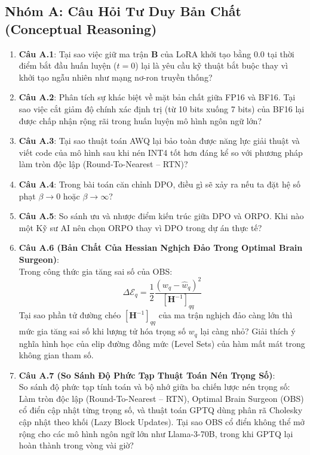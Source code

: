 \subsection{Nhóm A: Câu Hỏi Tư Duy Bản Chất (Conceptual Reasoning)}
\begin{enumerate}
  \item \textbf{Câu A.1}: Tại sao việc giữ ma trận $\mathbf{B}$ của LoRA khởi tạo bằng $0.0$ tại thời điểm bắt đầu huấn luyện ($t=0$) lại là yêu cầu kỹ thuật bắt buộc thay vì khởi tạo ngẫu nhiên như mạng nơ-ron truyền thống?
  \item \textbf{Câu A.2}: Phân tích sự khác biệt về mặt bản chất giữa FP16 và BF16. Tại sao việc cắt giảm độ chính xác định trị (từ 10 bits xuống 7 bits) của BF16 lại được chấp nhận rộng rãi trong huấn luyện mô hình ngôn ngữ lớn?
  \item \textbf{Câu A.3}: Tại sao thuật toán AWQ lại bảo toàn được năng lực giải thuật và viết code của mô hình sau khi nén INT4 tốt hơn đáng kể so với phương pháp làm tròn độc lập (Round-To-Nearest -- RTN)?
  \item \textbf{Câu A.4}: Trong bài toán căn chỉnh DPO, điều gì sẽ xảy ra nếu ta đặt hệ số phạt $\beta \to 0$ hoặc $\beta \to \infty$?
  \item \textbf{Câu A.5}: So sánh ưu và nhược điểm kiến trúc giữa DPO và ORPO. Khi nào một Kỹ sư AI nên chọn ORPO thay vì DPO trong dự án thực tế?
  \item \textbf{Câu A.6 (Bản Chất Của Hessian Nghịch Đảo Trong Optimal Brain Surgeon)}: \\
  Trong công thức gia tăng sai số của OBS:
  \begin{equation*}
  \Delta \mathcal{E}_q = \frac{1}{2} \frac{(w_q - \hat{w}_q)^2}{[\mathbf{H}^{-1}]_{qq}}
  \end{equation*}
  Tại sao phần tử đường chéo $[\mathbf{H}^{-1}]_{qq}$ của ma trận nghịch đảo càng lớn thì mức gia tăng sai số khi lượng tử hóa trọng số $w_q$ lại càng nhỏ? Giải thích ý nghĩa hình học của elip đường đồng mức (Level Sets) của hàm mất mát trong không gian tham số.
  \item \textbf{Câu A.7 (So Sánh Độ Phức Tạp Thuật Toán Nén Trọng Số)}: \\
  So sánh độ phức tạp tính toán và bộ nhớ giữa ba chiến lược nén trọng số: Làm tròn độc lập (Round-To-Nearest -- RTN), Optimal Brain Surgeon (OBS) cổ điển cập nhật từng trọng số, và thuật toán GPTQ dùng phân rã Cholesky cập nhật theo khối (Lazy Block Updates). Tại sao OBS cổ điển không thể mở rộng cho các mô hình ngôn ngữ lớn như Llama-3-70B, trong khi GPTQ lại hoàn thành trong vòng vài giờ?


\end{enumerate}
